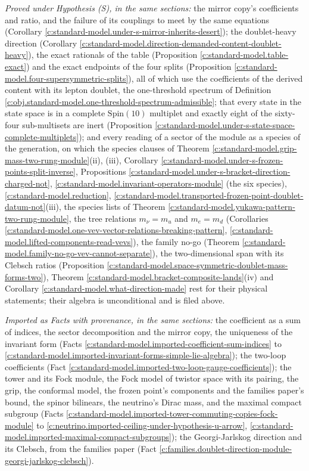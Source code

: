 \documentclass[11pt]{article}
\theoremstyle{definition}
\theoremstyle{plain}
\begin{document}
\emph{Proved under Hypothesis (S), in the same sections:} the mirror copy's coefficients and ratio, and the failure of its couplings to meet by the same equations (Corollary \ref{c:standard-model.under-s-mirror-inherits-desert}); the doublet-heavy direction (Corollary \ref{c:standard-model.direction-demanded-content-doublet-heavy}), the exact rationals of the table (Proposition \ref{c:standard-model.table-exact}) and the exact endpoints of the four splits (Proposition \ref{c:standard-model.four-supersymmetric-splits}), all of which use the coefficients of the derived content with its lepton doublet, the one-threshold spectrum of Definition \ref{c:obj.standard-model.one-threshold-spectrum-admissible}; that every state in the state space is in a complete $\mathrm{Spin}(10)$ multiplet and exactly eight of the sixty-four sub-multisets are inert (Proposition \ref{c:standard-model.under-s-state-space-complete-multiplets}); and every reading of a sector of the module as a species of the generation, on which the species clauses of Theorem \ref{c:standard-model.grip-mass-two-rung-module}(ii), (iii), Corollary \ref{c:standard-model.under-s-frozen-points-split-inverse}, Propositions \ref{c:standard-model.under-s-bracket-direction-charged-not}, \ref{c:standard-model.invariant-operators-module} (the six species), \ref{c:standard-model.reduction}, \ref{c:standard-model.transported-frozen-point-doublet-datum-not}(iii), the species lists of Theorem \ref{c:standard-model.yukawa-pattern-two-rung-module}, the tree relations $m_{\nu} = m_{u}$ and $m_{e} = m_{d}$ (Corollaries \ref{c:standard-model.one-vev-vector-relations-breaking-pattern}, \ref{c:standard-model.lifted-components-read-vevs}), the family no-go (Theorem \ref{c:standard-model.family-no-go-vev-cannot-separate}), the two-dimensional span with its Clebsch ratios (Proposition \ref{c:standard-model.space-symmetric-doublet-mass-forms-two}), Theorem \ref{c:standard-model.bracket-composite-lands}(iv) and Corollary \ref{c:standard-model.what-direction-made} rest for their physical statements; their algebra is unconditional and is filed above.

\emph{Imported as Facts with provenance, in the same sections:} the coefficient as a sum of indices, the sector decomposition and the mirror copy, the uniqueness of the invariant form (Facts \ref{c:standard-model.imported-coefficient-sum-indices} to \ref{c:standard-model.imported-invariant-forms-simple-lie-algebra}); the two-loop coefficients (Fact \ref{c:standard-model.imported-two-loop-gauge-coefficients}); the tower and its Fock module, the Fock model of twistor space with its pairing, the grip, the conformal model, the frozen point's components and the families paper's bound, the spinor bilinears, the neutrino's Dirac mass, and the maximal compact subgroup (Facts \ref{c:standard-model.imported-tower-commuting-copies-fock-module} to \ref{c:neutrino.imported-ceiling-under-hypothesis-u-arrow}, \ref{c:standard-model.imported-maximal-compact-subgroups}); the Georgi-Jarlskog direction and its Clebsch, from the families paper (Fact \ref{c:families.doublet-direction-module-georgi-jarlskog-clebsch}).
\end{document}
